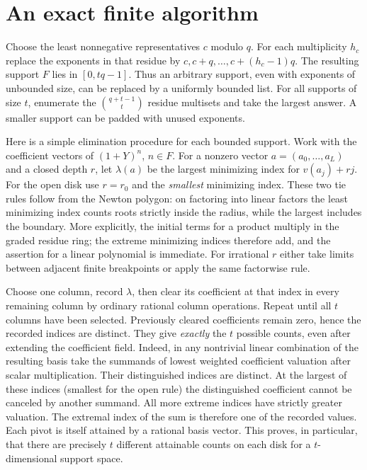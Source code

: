 \documentclass[11pt]{article}
\begin{document}
\section{An exact finite algorithm}
Choose the least nonnegative representatives $c$ modulo $q$. For each multiplicity $h_c$ replace the exponents in that residue by $c,c+q,\ldots,c+(h_c-1)q$. The resulting support $F$ lies in $[0,tq-1]$. Thus an arbitrary support, even with exponents of unbounded size, can be replaced by a uniformly bounded list. For all supports of size $t$, enumerate the $\binom{q+t-1}{t}$ residue multisets and take the largest answer. A smaller support can be padded with unused exponents.

Here is a simple elimination procedure for each bounded support. Work with the coefficient vectors of $(1+Y)^n$, $n\in F$. For a nonzero vector $a=(a_0,\ldots,a_L)$ and a closed depth $r$, let $\lambda(a)$ be the largest minimizing index for $v(a_j)+rj$. For the open disk use $r=r_0$ and the \emph{smallest} minimizing index. These two tie rules follow from the Newton polygon: on factoring into linear factors the least minimizing index counts roots strictly inside the radius, while the largest includes the boundary. More explicitly, the initial terms for a product multiply in the graded residue ring; the extreme minimizing indices therefore add, and the assertion for a linear polynomial is immediate. For irrational $r$ either take limits between adjacent finite breakpoints or apply the same factorwise rule.

Choose one column, record $\lambda$, then clear its coefficient at that index in every remaining column by ordinary rational column operations. Repeat until all $t$ columns have been selected. Previously cleared coefficients remain zero, hence the recorded indices are distinct. They give \emph{exactly} the $t$ possible counts, even after extending the coefficient field. Indeed, in any nontrivial linear combination of the resulting basis take the summands of lowest weighted coefficient valuation after scalar multiplication. Their distinguished indices are distinct. At the largest of these indices (smallest for the open rule) the distinguished coefficient cannot be canceled by another summand. All more extreme indices have strictly greater valuation. The extremal index of the sum is therefore one of the recorded values. Each pivot is itself attained by a rational basis vector. This proves, in particular, that there are precisely $t$ different attainable counts on each disk for a $t$-dimensional support space.
\end{document}
